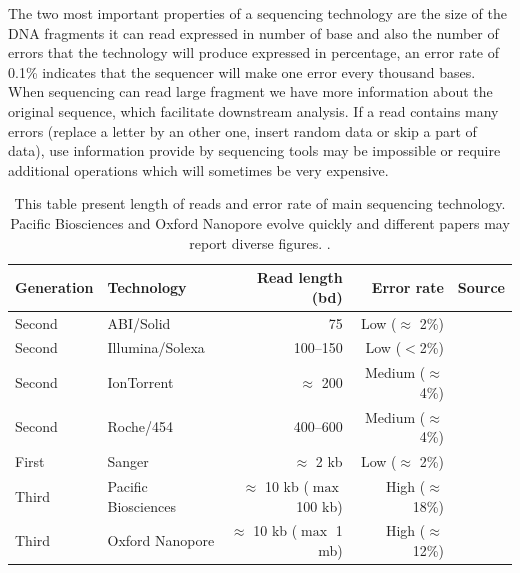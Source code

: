 \documentclass[./main.tex]{subfiles}
\begin{document}
The two most important properties of a sequencing technology are the size of the DNA fragments it can read expressed in number of base and also the number of errors that the technology will produce expressed in percentage, an error rate of 0.1\% indicates that the sequencer will make one error every thousand bases.
When sequencing can read large fragment we have more information about the original sequence, which facilitate downstream analysis.
If a read contains many errors (replace a letter by an other one, insert random data or skip a part of data), use information provide by sequencing tools may be impossible or require additional operations which will sometimes be very expensive.

\begin{table}[ht]
    \centering
    \begin{tabular}{ll|rr|l}
Generation & Technology          & Read length (bd)                 & Error rate             & Source                          \\ \hline
Second     & ABI/Solid           & 75                               & Low ($\approx$ 2\%)    & \cite{seq_assembly_demystified} \\
Second     & Illumina/Solexa     & 100–150                          & Low ($<$2\%)             & \cite{seq_assembly_demystified} \\
Second     & IonTorrent          & $\approx$ 200                    & Medium ($\approx$ 4\%) & \cite{seq_assembly_demystified} \\
Second     & Roche/454           & 400–600                          & Medium ($\approx$ 4\%) & \cite{seq_assembly_demystified} \\
First      & Sanger              & $\approx$ 2 kb                   & Low ($\approx$ 2\%)    & \cite{seq_assembly_demystified} \\
Third      & Pacific Biosciences & $\approx$ 10 kb ($\max$ 100 kb)  & High ($\approx$ 18\%)  & \cite{seq_assembly_demystified} \cite{longread_dark_matter} \\
Third      & Oxford Nanopore     & $\approx$ 10 kb ($\max$ 1 mb)    & High ($\approx$ 12\%)  & \cite{longread_dark_matter} \cite{nanopore_read_accuracy} \\
    \end{tabular}
    \caption{This table present length of reads and error rate of main sequencing technology. Pacific Biosciences and Oxford Nanopore evolve quickly and different papers may report diverse figures.
    .}
    \label{intro:tab:technology_property}
\end{table}
\end{document}
